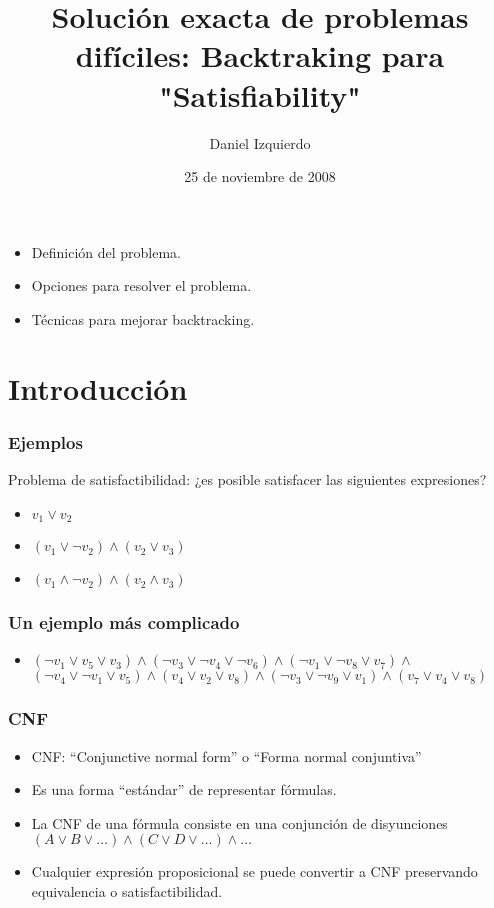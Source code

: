 \documentclass{beamer}
\begin{document}
\title{Solución exacta de problemas difíciles: Backtraking para "Satisfiability"}
\author{Daniel Izquierdo}
\date{25 de noviembre de 2008}

\frame{\titlepage}

\section[Contenido]{}
\frame
{
  \begin{itemize}
  \item Definición del problema.
  \item Opciones para resolver el problema.
  \item Técnicas para mejorar backtracking.
  \end{itemize}
}

\section{Introducción}

\frame
{
  \frametitle{Ejemplos}

  Problema de satisfactibilidad: ¿es posible satisfacer las siguientes expresiones?

  \begin{itemize}
  \item $v_1 \vee v_2$
  \item $(v_1 \vee \neg v_2) \wedge (v_2 \vee v_3)$
  \item $(v_1 \wedge \neg v_2) \wedge (v_2 \wedge v_3)$
  \end{itemize}
}

\frame
{
  \frametitle{Un ejemplo más complicado}

  \begin{itemize}
  \item $(\neg v_{1} \vee v_5 \vee v_3) \wedge (\neg v_{3} \vee \neg v_{4} \vee \neg v_{6}) \wedge (\neg v_{1} \vee \neg v_{8} \vee v_{7}) \wedge$
        $(\neg v_{4} \vee \neg v_{1} \vee v_{5}) \wedge (v_4 \vee v_2 \vee v_8) \wedge (\neg v_3 \vee \neg v_9 \vee v_1) \wedge (v_7 \vee v_4 \vee v_8)$
  \end{itemize}
}

\frame
{
  \frametitle{CNF}

  \begin{itemize}
  \item CNF: ``Conjunctive normal form'' o ``Forma normal conjuntiva''
  \item Es una forma ``estándar'' de representar fórmulas.
  \item La CNF de una fórmula consiste en una conjunción de disyunciones $(A \vee B \vee \ldots) \wedge (C \vee D \vee \ldots) \wedge \ldots$
  \item Cualquier expresión proposicional se puede convertir a CNF preservando
        equivalencia o satisfactibilidad.
  \end{itemize}
}
\end{document}
